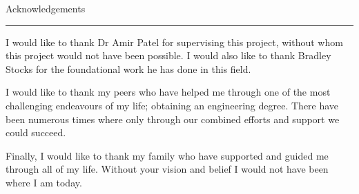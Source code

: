 \pagestyle{plain}


{\Large Acknowledgements}
\vskip 5mm
\hrule
\vskip 5mm

I would like to thank Dr Amir Patel for supervising this project, without whom this project would not have been possible. I would also like to thank Bradley Stocks for the foundational work he has done in this field.

I would like to thank my peers who have helped me through one of the most challenging endeavours of my life; obtaining an engineering degree. There have been numerous times where only through our combined efforts and support we could succeed.

Finally, I would like to thank my family who have supported and guided me through all of my life. Without your vision and belief I would not have been where I am today. 



